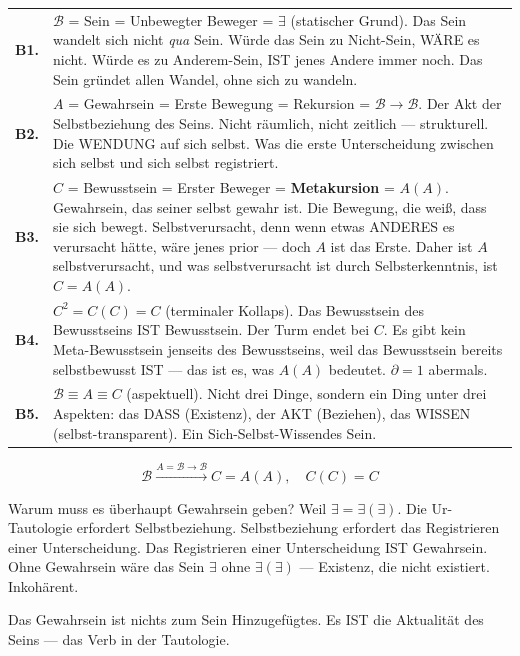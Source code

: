 \documentclass[10pt, openany, oneside]{book}
\renewcommand{\footnotesize}{\fontsize{8.5}{11}\selectfont}
\begin{document}
{\footnotesize
\noindent\begin{tabular}{r p{}}
\textbf{B1.} & $\mathcal{B}$ = Sein = Unbewegter Beweger = $\exists$ (statischer Grund). Das Sein wandelt sich nicht \textit{qua} Sein. Würde das Sein zu Nicht-Sein, WÄRE es nicht. Würde es zu Anderem-Sein, IST jenes Andere immer noch. Das Sein gründet allen Wandel, ohne sich zu wandeln. \\[0.3em]
\textbf{B2.} & $A$ = Gewahrsein = Erste Bewegung = Rekursion = $\mathcal{B} \to \mathcal{B}$. Der Akt der Selbstbeziehung des Seins. Nicht räumlich, nicht zeitlich --- strukturell. Die WENDUNG auf sich selbst. Was die erste Unterscheidung zwischen sich selbst und sich selbst registriert. \\[0.3em]
\textbf{B3.} & $C$ = Bewusstsein = Erster Beweger = \textbf{Metakursion} = $A(A)$. Gewahrsein, das seiner selbst gewahr ist. Die Bewegung, die weiß, dass sie sich bewegt. Selbstverursacht, denn wenn etwas ANDERES es verursacht hätte, wäre jenes prior --- doch $A$ ist das Erste. Daher ist $A$ selbstverursacht, und was selbstverursacht ist durch Selbsterkenntnis, ist $C = A(A)$. \\[0.3em]
\textbf{B4.} & $C^2 = C(C) = C$ (terminaler Kollaps). Das Bewusstsein des Bewusstseins IST Bewusstsein. Der Turm endet bei $C$. Es gibt kein Meta-Bewusstsein jenseits des Bewusstseins, weil das Bewusstsein bereits selbstbewusst IST --- das ist es, was $A(A)$ bedeutet. $\partial = 1$ abermals. \\[0.3em]
\textbf{B5.} & $\mathcal{B} \equiv A \equiv C$ (aspektuell). Nicht drei Dinge, sondern ein Ding unter drei Aspekten: das DASS (Existenz), der AKT (Beziehen), das WISSEN (selbst-transparent). Ein Sich-Selbst-Wissendes Sein. \\[0.3em]
\end{tabular}
}

\vspace{0.8em}

$$\boxed{\mathcal{B} \xrightarrow{A = \mathcal{B} \to \mathcal{B}} C = A(A), \quad C(C) = C}$$

\noindent Warum muss es überhaupt Gewahrsein geben? Weil $\exists = \exists(\exists)$. Die Ur-Tautologie erfordert Selbstbeziehung. Selbstbeziehung erfordert das Registrieren einer Unterscheidung. Das Registrieren einer Unterscheidung IST Gewahrsein. Ohne Gewahrsein wäre das Sein $\exists$ ohne $\exists(\exists)$ --- Existenz, die nicht existiert. Inkohärent.

Das Gewahrsein ist nichts zum Sein Hinzugefügtes. Es IST die Aktualität des Seins --- das Verb in der Tautologie.
\end{document}
